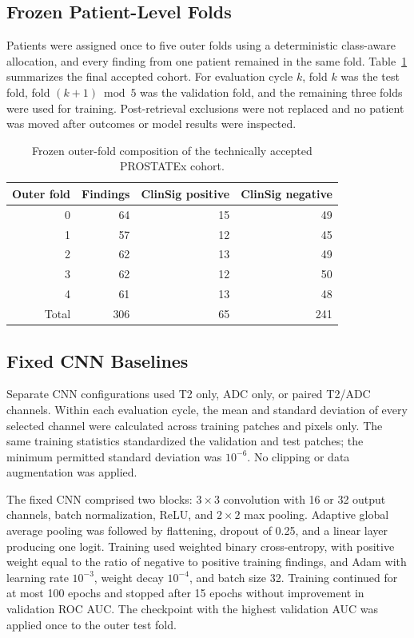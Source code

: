 \documentclass[11pt]{article}
\begin{document}
\subsection{Frozen Patient-Level Folds}\label{sec:3.5}

Patients were assigned once to five outer folds using a deterministic class-aware allocation, and every finding from one patient remained in the same fold. Table~\ref{tab:cohort-folds} summarizes the final accepted cohort. For evaluation cycle $k$, fold $k$ was the test fold, fold $(k+1)\bmod 5$ was the validation fold, and the remaining three folds were used for training. Post-retrieval exclusions were not replaced and no patient was moved after outcomes or model results were inspected.

\begin{table}[htbp]
\centering
\caption{Frozen outer-fold composition of the technically accepted PROSTATEx cohort.}
\label{tab:cohort-folds}
\begin{tabular}{@{}rrrr@{}}
\toprule
\textbf{Outer fold} & \textbf{Findings} & \textbf{ClinSig positive} & \textbf{ClinSig negative} \\
\midrule
0 & 64 & 15 & 49 \\
1 & 57 & 12 & 45 \\
2 & 62 & 13 & 49 \\
3 & 62 & 12 & 50 \\
4 & 61 & 13 & 48 \\
\midrule
Total & 306 & 65 & 241 \\
\bottomrule
\end{tabular}
\end{table}

\subsection{Fixed CNN Baselines}\label{sec:3.6}

Separate CNN configurations used T2 only, ADC only, or paired T2/ADC channels. Within each evaluation cycle, the mean and standard deviation of every selected channel were calculated across training patches and pixels only. The same training statistics standardized the validation and test patches; the minimum permitted standard deviation was $10^{-6}$. No clipping or data augmentation was applied.

The fixed CNN comprised two blocks: $3\times3$ convolution with 16 or 32 output channels, batch normalization, ReLU, and $2\times2$ max pooling. Adaptive global average pooling was followed by flattening, dropout of 0.25, and a linear layer producing one logit. Training used weighted binary cross-entropy, with positive weight equal to the ratio of negative to positive training findings, and Adam with learning rate $10^{-3}$, weight decay $10^{-4}$, and batch size 32. Training continued for at most 100 epochs and stopped after 15 epochs without improvement in validation ROC AUC. The checkpoint with the highest validation AUC was applied once to the outer test fold.
\end{document}
